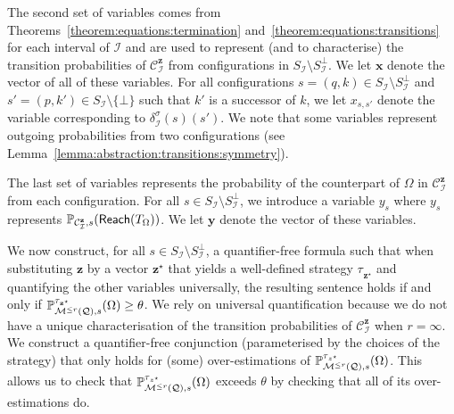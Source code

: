 \documentclass[a4paper,UKenglish,cleveref,autoref,thm-restate,colorlinks]{lipics-v2021}
\newcommand{\mdp}{\mathcal{M}}
\newcommand{\mdpStateSpace}{S}
\newcommand{\mdpTrans}{\delta}
\newcommand{\ocmdp}{\mathcal{Q}}
\newcommand{\ocmdpFin}[2]{\mdp^{\leq #2}(#1)}
\newcommand{\ocState}{q}
\newcommand{\ocStateB}{p}
\newcommand{\ocCount}{k}
\newcommand{\ocCountB}{k'}
\newcommand{\ocConfig}{s}
\newcommand{\counterUB}{r}
\newcommand{\mchain}{\mathcal{C}}
\newcommand{\intPart}{\mathcal{I}}
\newcommand{\compressChainStrat}[1]{\mchain^{#1}_{\intPart}}
\newcommand{\compressChainStateSpace}{\mdpStateSpace_{\intPart}}
\newcommand{\compressChainStateSpaceStar}{\mdpStateSpace_{\intPart}^{\bot}}
\newcommand{\compressChainTransTemplate}[2]{\mdpTrans^{#1}_{#2}}
\newcommand{\compressChainTrans}{\compressChainTransTemplate{\strat}{\intPart}}
\newcommand{\varTrans}{x}
\newcommand{\varTransTuple}{\mathbf{\varTrans}}
\newcommand{\varObj}{y}
\newcommand{\varObjTuple}{\mathbf{\varObj}}
\newcommand{\varStrat}{z}
\newcommand{\varStratTuple}{\mathbf{\varStrat}}
\newcommand{\solStrat}{\varStrat^{\star}}
\newcommand{\solStratTuple}{\mathbf{\varStrat}^{\star}}
\newcommand{\compressChainSymbolic}{\compressChainStrat{\varStratTuple}}
\newcommand{\objective}{\Omega}
\newcommand{\reach}[1]{\mathsf{Reach}(#1)}
\newcommand{\target}{T}
\newcommand{\thresProba}{\theta}
\newcommand{\stratGeneric}[1]{{\sigma_{#1}}}
\newcommand{\strat}{\stratGeneric{}}
\newcommand{\stratBGeneric}[1]{{\tau_{#1}}}
\newcommand{\stratB}{\stratBGeneric{}}
\begin{document}
The second set of variables comes from Theorems~\ref{theorem:equations:termination} and~\ref{theorem:equations:transitions} for each interval of $\intPart$ and are used to represent (and to characterise) the transition probabilities of $\compressChainSymbolic$ from configurations in $\compressChainStateSpace\setminus\compressChainStateSpaceStar$.
We let $\varTransTuple$ denote the vector of all of these variables.
For all configurations $\ocConfig=(\ocState, \ocCount)\in\compressChainStateSpace\setminus\compressChainStateSpaceStar$ and $\ocConfig'=(\ocStateB, \ocCountB)\in\compressChainStateSpace\setminus\{\bot\}$ such that $\ocCountB$ is a successor of $\ocCount$, we let $\varTrans_{\ocConfig, \ocConfig'}$ denote the variable corresponding to $\compressChainTrans(\ocConfig)(\ocConfig')$.
We note that some variables represent outgoing probabilities from two configurations (see Lemma~\ref{lemma:abstraction:transitions:symmetry}).

The last set of variables represents the probability of the counterpart of $\objective$ in $\compressChainSymbolic$ from each configuration.
For all $\ocConfig\in\compressChainStateSpace\setminus\compressChainStateSpaceStar$, we introduce a variable $\varObj_{\ocConfig}$ where $\varObj_{\ocConfig}$ represents $\probaMCverb{\compressChainSymbolic}{\ocConfig}(\reach{\target_\objective})$.
We let $\varObjTuple$ denote the vector of these variables.

We now construct, for all $\ocConfig\in\compressChainStateSpace\setminus\compressChainStateSpaceStar$, a quantifier-free formula such that when substituting $\varStratTuple$ by a vector $\solStratTuple$ that yields a well-defined strategy $\stratB_{\solStratTuple}$ and quantifying the other variables universally, the resulting sentence holds if and only if $\probaGverb{\ocmdpFin{\ocmdp}{\counterUB}}{\ocConfig}{\stratB_{\solStratTuple}}(\objective)\geq\thresProba$.
We rely on universal quantification because we do not have a unique characterisation of the transition probabilities of $\compressChainSymbolic$ when $\counterUB=\infty$.
We construct a quantifier-free conjunction (parameterised by the choices of the strategy) that only holds for (some) over-estimations of $\probaGverb{\ocmdpFin{\ocmdp}{\counterUB}}{\ocConfig}{\stratB_{\solStrat}}(\objective)$.
This allows us to check that $\probaGverb{\ocmdpFin{\ocmdp}{\counterUB}}{\ocConfig}{\stratB_{\solStrat}}(\objective)$ exceeds $\thresProba$ by checking that all of its over-estimations do.
\end{document}
